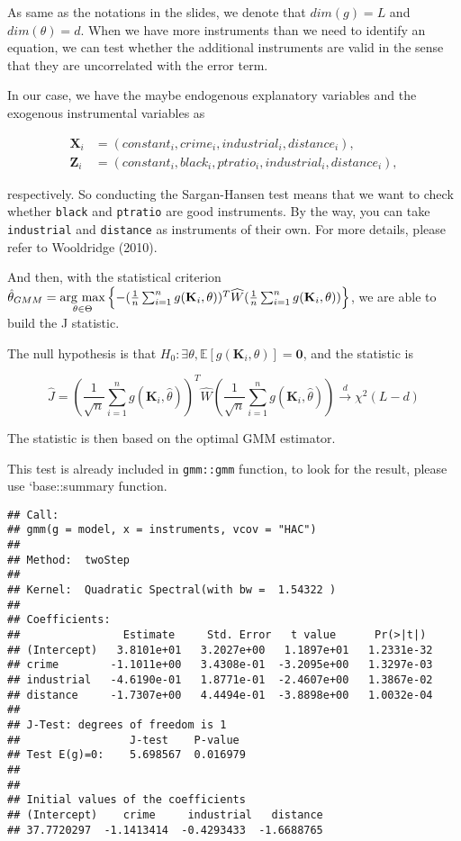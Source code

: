 \documentclass[
  12pt,
]{article}
\begin{document}
As same as the notations in the slides, we denote that \(dim(g) = L\) and \(dim(\theta) = d\). When we have more instruments than we need to identify an equation, we can test whether the additional instruments are valid in the sense that they are uncorrelated with the error term.

In our case, we have the maybe endogenous explanatory variables and the exogenous instrumental variables as

\begin{align*}
    \mathbf{X}_i & = (constant_i, crime_i, industrial_i, distance_i),\\
    \mathbf{Z}_i & = (constant_i, black_i, ptratio_i, industrial_i, distance_i),
\end{align*}

respectively. So conducting the Sargan-Hansen test means that we want to check whether \texttt{black} and \texttt{ptratio} are good instruments. By the way, you can take \texttt{industrial} and \texttt{distance} as instruments of their own. For more details, please refer to Wooldridge (2010).

And then, with the statistical criterion \(\hat{\theta}_{GMM} = \mathop{\rm arg~max}\limits_{\theta \in \Theta}\left\{- (\frac{1}{n}\sum_{i =1}^{n}g(\mathbf{K}_i, \theta) )^T \widehat{W} (\frac{1}{n}\sum_{i =1}^{n}g(\mathbf{K}_i, \theta) )\right\}\), we are able to build the J statistic.

The null hypothesis is that \(H_0: \exists \theta, \mathbb{E}[g(\mathbf{K}_i, \theta) ] = \mathbf{0}\), and the statistic is

\[
    \hat{J} = (\frac{1}{\sqrt{n}}\sum_{i =1}^{n}g(\mathbf{K}_i, \hat{\theta}) )^T \widehat{W} (\frac{1}{\sqrt{n}}\sum_{i =1}^{n}g(\mathbf{K}_i, \hat{\theta}) ) \stackrel{d}{\to} \chi^2 (L - d)
\]

The statistic is then based on the optimal GMM estimator.

This test is already included in \texttt{gmm::gmm} function, to look for the result, please use `base::summary function.

\begin{verbatim}
## Call:
## gmm(g = model, x = instruments, vcov = "HAC")
##
## Method:  twoStep 
## 
## Kernel:  Quadratic Spectral(with bw =  1.54322 )
## 
## Coefficients:
##                Estimate     Std. Error   t value      Pr(>|t|)   
## (Intercept)   3.8101e+01   3.2027e+00   1.1897e+01   1.2331e-32
## crime        -1.1011e+00   3.4308e-01  -3.2095e+00   1.3297e-03
## industrial   -4.6190e-01   1.8771e-01  -2.4607e+00   1.3867e-02
## distance     -1.7307e+00   4.4494e-01  -3.8898e+00   1.0032e-04
##
## J-Test: degrees of freedom is 1 
##                 J-test    P-value 
## Test E(g)=0:    5.698567  0.016979
##
## 
## Initial values of the coefficients
## (Intercept)    crime     industrial   distance 
## 37.7720297  -1.1413414  -0.4293433  -1.6688765 
\end{verbatim}
\end{document}
